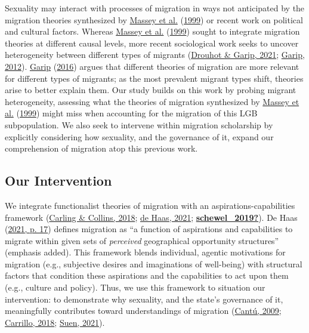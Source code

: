 \documentclass[
  11pt,
]{article}
\begin{document}
Sexuality may interact with processes of migration in ways not anticipated by the migration theories synthesized by \protect\hyperlink{ref-massey_1999}{Massey et al.} (\protect\hyperlink{ref-massey_1999}{1999}) or recent work on political and cultural factors. Whereas \protect\hyperlink{ref-massey_1999}{Massey et al.} (\protect\hyperlink{ref-massey_1999}{1999}) sought to integrate migration theories at different causal levels, more recent sociological work seeks to uncover heterogeneity between different types of migrants (\protect\hyperlink{ref-drouhot_2021_what}{Drouhot \& Garip, 2021}; \protect\hyperlink{ref-garip_2012}{Garip, 2012}). \protect\hyperlink{ref-garip_2016}{Garip} (\protect\hyperlink{ref-garip_2016}{2016}) argues that different theories of migration are more relevant for different types of migrants; as the most prevalent migrant types shift, theories arise to better explain them. Our study builds on this work by probing migrant heterogeneity, assessing what the theories of migration synthesized by \protect\hyperlink{ref-massey_1999}{Massey et al.} (\protect\hyperlink{ref-massey_1999}{1999}) might miss when accounting for the migration of this LGB subpopulation. We also seek to intervene within migration scholarship by explicitly considering how sexuality, and the governance of it, expand our comprehension of migration atop this previous work.

\hypertarget{our-intervention}{%
\subsection{Our Intervention}\label{our-intervention}}

We integrate functionalist theories of migration with an aspirations-capabilities framework (\protect\hyperlink{ref-carling_2018_aspiration}{Carling \& Collins, 2018}; \protect\hyperlink{ref-dehaas_2021}{de Haas, 2021}; \protect\hyperlink{ref-schewel_2019}{\textbf{schewel\_2019?}}). De Haas (\protect\hyperlink{ref-dehaas_2021}{2021, p. 17}) defines migration as ``a function of aspirations and capabilities to migrate within given sets of \emph{perceived} geographical opportunity structures'' (emphasis added). This framework blends individual, agentic motivations for migration (e.g., subjective desires and imaginations of well-being) with structural factors that condition these aspirations and the capabilities to act upon them (e.g., culture and policy). Thus, we use this framework to situation our intervention: to demonstrate why sexuality, and the state's governance of it, meaningfully contributes toward understandings of migration (\protect\hyperlink{ref-cantu_2009}{Cantú, 2009}; \protect\hyperlink{ref-carrillo_2018}{Carrillo, 2018}; \protect\hyperlink{ref-suen_2021_sexual}{Suen, 2021}).
\end{document}
